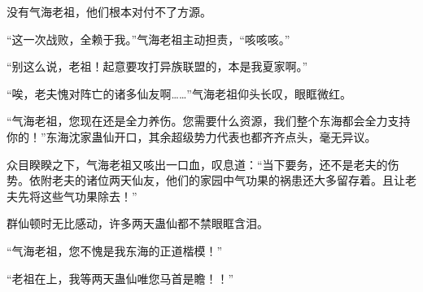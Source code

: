 \begin{this_body}
没有气海老祖，他们根本对付不了方源。

“这一次战败，全赖于我。”气海老祖主动担责，“咳咳咳。”

“别这么说，老祖！起意要攻打异族联盟的，本是我夏家啊。”

“唉，老夫愧对阵亡的诸多仙友啊……”气海老祖仰头长叹，眼眶微红。

“气海老祖，您现在还是全力养伤。您需要什么资源，我们整个东海都会全力支持你的！”东海沈家蛊仙开口，其余超级势力代表也都齐齐点头，毫无异议。

众目睽睽之下，气海老祖又咳出一口血，叹息道：“当下要务，还不是老夫的伤势。依附老夫的诸位两天仙友，他们的家园中气功果的祸患还大多留存着。且让老夫先将这些气功果除去！”

群仙顿时无比感动，许多两天蛊仙都不禁眼眶含泪。

“气海老祖，您不愧是我东海的正道楷模！”

“老祖在上，我等两天蛊仙唯您马首是瞻！！”

\end{this_body}

